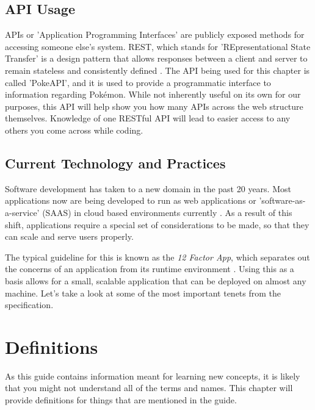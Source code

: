 \documentclass[12pt, oneside, a4paper]{book}
\begin{document}
      \section{API Usage}
      APIs or 'Application Programming Interfaces' are publicly exposed methods for accessing someone else's system.
      REST, which stands for 'REpresentational State Transfer' is a design pattern that allows responses between a client and server to remain stateless and consistently defined \autocite{hallettPokeAPI}.
      The API being used for this chapter is called 'PokeAPI', and it is used to provide a programmatic interface to information regarding Pokémon.
      While not inherently useful on its own for our purposes, this API will help show you how many APIs across the web structure themselves.
      Knowledge of one RESTful API will lead to easier access to any others you come across while coding.

      \section{Current Technology and Practices}
      Software development has taken to a new domain in the past 20 years.
      Most applications now are being developed to run as web applications or 'software-as-a-service' (SAAS) in cloud based environments currently \autocite{WhatCloudComputing}.
      As a result of this shift, applications require a special set of considerations to be made, so that they can scale and serve users properly.

      The typical guideline for this is known as the \textit{12 Factor App\footnotemark}, which separates out the concerns of an application from its runtime environment \autocite{wigginsTwelveFactorApp2017}.
      Using this as a basis allows for a small, scalable application that can be deployed on almost any machine.
      Let's take a look at some of the most important tenets from the specification.

   \chapter*{Definitions}
   \label{chap:definitions}
      As this guide contains information meant for learning new concepts, it is likely that you might not understand all of the terms and names.
      This chapter will provide definitions for things that are mentioned in the guide.

\newpage
{}
\printbibliography[title={Works Cited},heading=bibintoc]
\end{document}
